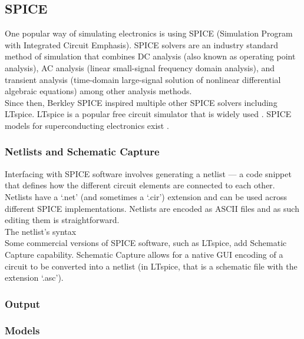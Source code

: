\documentclass{article}
\newcommand{\ccf}[1]{`\textsf{#1}'}
\begin{document}



\subsection{SPICE}

One popular way of simulating electronics is using SPICE 
(Simulation Program with Integrated Circuit Emphasis). 
SPICE solvers are an industry standard method of simulation that combines DC analysis (also known as
operating point analysis), AC analysis (linear small-signal frequency domain analysis), and 
transient analysis (time-domain large-signal solution of nonlinear differential algebraic equations)
among other analysis methods.\\

Since then, Berkley SPICE
inspired multiple other SPICE solvers including LTspice.
 
LTspice is a popular free circuit simulator that is widely used . SPICE models for 
superconducting electronics exist . 

\subsubsection{Netlists and Schematic Capture}

Interfacing with SPICE software involves generating a netlist --- a code snippet that defines
how the different circuit elements are connected to each other. Netlists have a \ccf{.net} (and 
sometimes a \ccf{.cir}) extension and can be used across different SPICE implementations. 
Netlists are encoded as ASCII files and as such editing them is straightforward.\\

The netlist's syntax \\

Some commercial versions of SPICE
software, such as LTspice, add Schematic Capture capability. Schematic Capture allows for a
native GUI encoding of a circuit to be converted into a netlist (in LTspice, that is a 
schematic file with the extension \ccf{.asc}).\\

\subsubsection{Output}

\subsubsection{Models}
\end{document}
